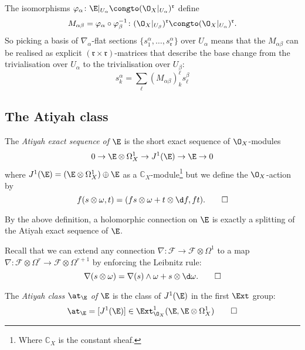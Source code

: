     The isomorphisms $\varphi_\alpha\colon\E|_{U_\alpha}\congto(\O_X|_{U_\alpha})^\mathfrak{r}$ define
    \begin{equation}
        M_{\alpha\beta} = \varphi_\alpha\circ\varphi_\beta^{-1}\colon (\O_X|_{U_\beta})^\mathfrak{r}\congto(\O_X|_{U_\alpha})^\mathfrak{r}.
    \end{equation}
    So picking a basis of $\nabla_\alpha$-flat sections $\{s^{\alpha}_1,\ldots,s^{\alpha}_\mathfrak{r}\}$ over $U_\alpha$ means that the $M_{\alpha\beta}$ can be realised as explicit $(\mathfrak{r}\times \mathfrak{r})$-matrices that describe the base change from the trivialisation over $U_\alpha$ to the trivialisation over $U_\beta$:
    \begin{equation}
        s^\alpha_k = \sum_\ell(M_{\alpha\beta})_k^\ell s^\beta_\ell
    \end{equation}

    \subsection{The Atiyah class} %
    \label{sub:the_atiyah_class}
    
        \begin{definition}
            The \emph{Atiyah exact sequence of $\E$} is the short exact sequence of $\O_X$-modules
            \[
                0 \to \E\otimes\Omega_X^1 \to J^1(\E) \to \E \to 0
            \]
            where $J^1(\E) = (\E\otimes\Omega_X^1)\oplus\E$ as a $\mathbb{C}_X$-module\footnote{Where $\mathbb{C}_X$ is the constant sheaf.} but we define the $\O_X$-action by
            \[
                f(s\otimes\omega,t) = (fs\otimes\omega+t\otimes\d f, ft).\qedhere
            \]
        \end{definition}

        By the above definition, a holomorphic connection on $\E$ is exactly a splitting of the Atiyah exact sequence of $\E$.

        \begin{note}\label{note:iterated-connection}
            Recall that we can extend any connection $\nabla\colon\mathcal{F}\to\mathcal{F}\otimes\Omega^1$ to a map $\nabla\colon\mathcal{F}\otimes\Omega^r\to\mathcal{F}\otimes\Omega^{r+1}$ by enforcing the Leibnitz rule:
            \[
                \nabla(s\otimes\omega) = \nabla(s)\wedge\omega + s\otimes\d\omega.\qedhere
            \]
        \end{note}

        \begin{definition}
            The \emph{Atiyah class $\at_\E$ of $\E$} is the class of $J^1(\E)$ in the first $\Ext$ group:
            \[
                \at_\E = [J^1(\E)] \in \Ext_{\O_X}^1(\E,\E\otimes\Omega_X^1)\qedhere
            \]
        \end{definition}

